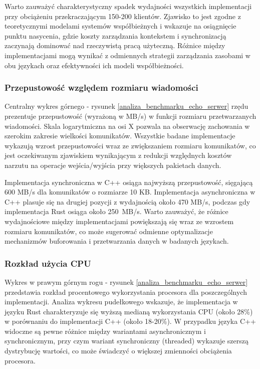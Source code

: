 Warto zauważyć charakterystyczny spadek wydajności wszystkich implementacji przy obciążeniu przekraczającym 150-200 klientów. Zjawisko to jest zgodne z teoretycznymi modelami systemów współbieżnych i wskazuje na osiągnięcie punktu nasycenia, gdzie koszty zarządzania kontekstem i synchronizacją zaczynają dominować nad rzeczywistą pracą użyteczną. Różnice między implementacjami mogą wynikać z odmiennych strategii zarządzania zasobami w obu językach oraz efektywności ich modeli współbieżności.

\subsubsection{Przepustowość względem rozmiaru wiadomości}
Centralny wykres górnego - rysunek \ref{analiza_benchmarku_echo_serwer} rzędu prezentuje przepustowość (wyrażoną w MB/s) w funkcji rozmiaru przetwarzanych wiadomości. Skala logarytmiczna na osi X pozwala na obserwację zachowania w szerokim zakresie wielkości komunikatów. Wszystkie badane implementacje wykazują wzrost przepustowości wraz ze zwiększaniem rozmiaru komunikatów, co jest oczekiwanym zjawiskiem wynikającym z redukcji względnych kosztów narzutu na operacje wejścia/wyjścia przy większych pakietach danych.

Implementacja synchroniczna w C++ osiąga najwyższą przepustowość, sięgającą 600 MB/s dla komunikatów o rozmiarze 10 KB. Implementacja asynchroniczna w C++ plasuje się na drugiej pozycji z wydajnością około 470 MB/s, podczas gdy implementacja Rust osiąga około \mbox{250 MB/s}. Warto zauważyć, że różnice wydajnościowe między implementacjami powiększają się wraz ze wzrostem rozmiaru komunikatów, co może sugerować odmienne optymalizacje mechanizmów buforowania i przetwarzania danych w badanych językach.

\subsubsection{Rozkład użycia CPU}
Wykres w prawym górnym rogu - rysunek \ref{analiza_benchmarku_echo_serwer} przedstawia rozkład procentowego wykorzystania procesora dla poszczególnych implementacji. Analiza wykresu pudełkowego wskazuje, że implementacja w języku Rust charakteryzuje się wyższą medianą wykorzystania CPU (około 28\%) w porównaniu do implementacji C++ (około 18-20\%). W przypadku języka C++ widoczne są pewne różnice między wariantami asynchronicznym i synchronicznym, przy czym wariant synchroniczny (threaded) wykazuje szerszą dystrybucję wartości, co może świadczyć o większej zmienności obciążenia procesora.

